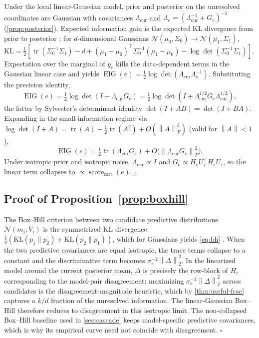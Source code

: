 \documentclass{article}
\newcommand{\scorecart}{\operatorname{score}_{\mathrm{cart}}}
\newcommand{\tr}{\operatorname{tr}}
\newcommand{\EIG}{\operatorname{EIG}}
\newcommand{\norm}[1]{\left\lVert #1 \right\rVert}
\theoremstyle{plain}
\theoremstyle{definition}
\theoremstyle{remark}
\begin{document}
Under the local linear-Gaussian model, prior and posterior on the
unresolved coordinates are Gaussian with covariances $\Lambda_{\mathrm{cur}}$
and $\Lambda_e=(\Lambda_{\mathrm{cur}}^{-1}+G_e)^{-1}$ (\cref{prop:posterior}).
Expected information gain is the expected KL divergence from prior to
posterior \citep{lindley1956,chaloner1995review}; for $d$-dimensional
Gaussians $\mathcal{N}(\mu_0,\Sigma_0)\to\mathcal{N}(\mu_1,\Sigma_1)$,
$\mathrm{KL}=\tfrac{1}{2}[\tr(\Sigma_0^{-1}\Sigma_1)-d+(\mu_1-\mu_0)^\top\Sigma_0^{-1}(\mu_1-\mu_0)-\log\det(\Sigma_0^{-1}\Sigma_1)]$.
Expectation over the marginal of $y_e$ kills the data-dependent terms in
the Gaussian linear case \citep[Eq.~7]{chaloner1995review} and yields
$\EIG(e)=\tfrac{1}{2}\log\det(\Lambda_{\mathrm{cur}}\Lambda_e^{-1})$.
Substituting the precision identity,
\[
\EIG(e)=\tfrac{1}{2}\log\det(I+\Lambda_{\mathrm{cur}}G_e)
=\tfrac{1}{2}\log\det(I+\Lambda_{\mathrm{cur}}^{1/2}G_e\Lambda_{\mathrm{cur}}^{1/2}),
\]
the latter by Sylvester's determinant identity
$\det(I+AB)=\det(I+BA)$. Expanding in the small-information regime via
$\log\det(I+A)=\tr(A)-\tfrac{1}{2}\tr(A^2)+O(\norm{A}_F^3)$ (valid for
$\norm{A}<1$),
\[
\EIG(e)=\tfrac{1}{2}\tr(\Lambda_{\mathrm{cur}}G_e)+O\!\big(\norm{\Lambda_{\mathrm{cur}}G_e}_F^2\big).
\]
Under isotropic prior and isotropic noise, $\Lambda_{\mathrm{cur}}\propto I$
and $G_e\propto H_e U_\tau^\top H_e U_\tau$, so the linear term collapses
to $\propto\scorecart(e)$. \hfill$\square$

\subsection{Proof of Proposition~\ref{prop:boxhill}}

The Box--Hill criterion between two candidate predictive distributions
$\mathcal{N}(m_i, V_i)$ is the symmetrized KL divergence
$\tfrac{1}{2}(\mathrm{KL}(p_1\|p_2)+\mathrm{KL}(p_2\|p_1))$, which for
Gaussians yields \eqref{eq:bh} \citep{boxhill1967}. When the two
predictive covariances are equal isotropic, the trace terms collapse to a
constant and the discriminative term becomes
$\sigma_e^{-2}\norm{\Delta}_2^2$. In the linearized model around the
current posterior mean, $\Delta$ is precisely the row-block of $H_e$
corresponding to the model-pair disagreement; maximizing
$\sigma_e^{-2}\norm{\Delta}_2^2$ across candidates is the
disagreement-magnitude heuristic, which by \cref{thm:useful-frac} captures
a $k/d$ fraction of the unresolved information. The linear-Gaussian
Box--Hill therefore reduces to disagreement in this isotropic limit. The
non-collapsed Box--Hill baseline used in \cref{sec:cascade} keeps
model-specific predictive covariances, which is why its empirical curve need
not coincide with disagreement. \hfill$\square$
\end{document}
